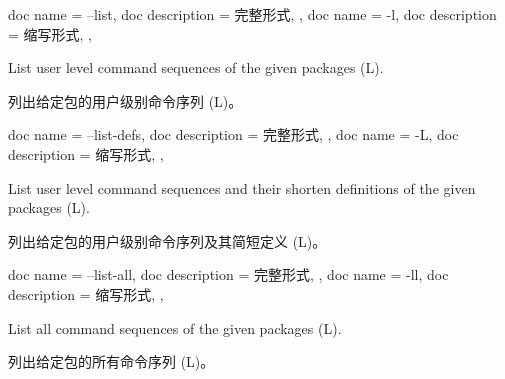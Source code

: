 \begin{docKeys}[
    doc no index,   %
    doc parameter = {~},
    ]
    {
    {
        doc name        = --list,
        doc description = 完整形式,
    },
    {
        doc name        = -l,
        doc description = 缩写形式,
    },
    }
    
List user level command sequences of the given packages (L).

列出给定包的用户级别命令序列 (L)。
    
\end{docKeys}
    
    

\begin{docKeys}[
    doc no index,   %
    doc parameter = {~},
    ]
    {
    {
        doc name        = --list-defs,
        doc description = 完整形式,
    },
    {
        doc name        = -L,
        doc description = 缩写形式,
    },
}

List user level command sequences and their shorten definitions of the given packages (L).

列出给定包的用户级别命令序列及其简短定义 (L)。
     
\end{docKeys}

\begin{docKeys}[
    doc no index,   %
    doc parameter = {~},
    ]
    {
    {
        doc name        = --list-all,
        doc description = 完整形式,
    },
    {
        doc name        = -ll,
        doc description = 缩写形式,
    },
}

List all command sequences of the given packages (L).

列出给定包的所有命令序列 (L)。
     
\end{docKeys}


